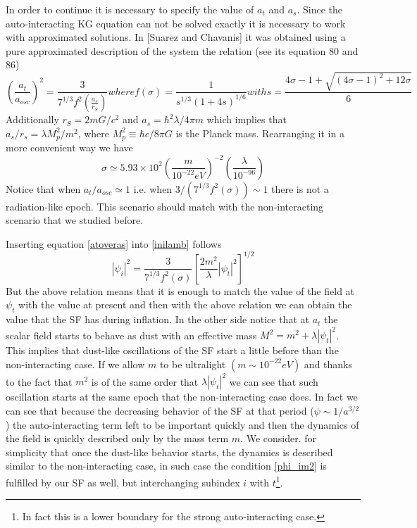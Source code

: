 \documentclass[twocolumn,           %
               showpacs,            %
               preprintnumbers,     %
               aps,                 %
               prl,          	    %
               letterpaper,             %
               superscriptaddress,      %
               nofootinbib,         %
               tightenlines,        %
               floats,floatfix      %
               ,usenatbib,
               ]{revtex4-1}
\begin{document}
In order to continue it is necessary to specify the value of $a_t$ and $a_s$. Since the auto-interacting KG equation can not be solved exactly it is necessary to work with approximated solutions. In [Suarez and Chavanis] it was obtained using a pure approximated description of the system the relation (see its equation 80 and 86)
\begin{subequations}
\begin{equation}\label{atoveras}
\left(\frac{a_t}{a_{osc}}\right)^2=\frac{3}{7^{1/3}f^2(\frac{a_s}{r_S})}
\end{equation}
where 
\begin{equation}
f(\sigma)=\frac{1}{s^{1/3}(1+4s)^{1/6}}
\end{equation}
with
\begin{equation}
s=\frac{4\sigma-1+\sqrt{(4\sigma-1)^2+12\sigma}}{6}
\end{equation}
\end{subequations}
Additionally $r_S=2mG/c^2$ and $a_s=\hbar^2\lambda/4\pi m$ which implies that $a_s/r_s=\lambda M_p^2/m^2$, where $M_p^2\equiv\hbar c/8\pi G$ is the Planck mass. Rearranging it in a more convenient way we have
\begin{equation}
\sigma \simeq 5.93\times 10^{
2}\left(\frac{m}{10^{-22}eV}\right)^{-2}\left(\frac{\lambda}{10^{-96}}\right)
\end{equation}
Notice that when $a_t/a_{osc}\simeq 1$ i.e. when $3/(7^{1/3}f^2(\sigma))\sim 1$ there is not a radiation-like epoch. This scenario should match with the non-interacting scenario that we studied before.

Inserting equation \eqref{atoveras} into \eqref{inilamb} follows
\begin{equation}\label{inilamb2}
|\psi_i|^2=\frac{3}{7^{1/3}f^2(\sigma)}\left[\frac{2m^2}{\lambda}|\psi_t|^2\right]^{1/2}
\end{equation}
But the above relation means that it is enough to match the value of the field at $\psi_t$ with the value at present and then with the above relation we can obtain the value that the SF has during inflation. In the other side notice that at $a_t$ the scalar field starts to behave as dust with an effective mass $M^2=m^2+\lambda|\psi_t|^2$. This implies that dust-like oscillations of the SF start a little before than the non-interacting case. If we allow $m$ to be ultralight $(m\sim 10^{-22}eV)$ and thanks to the fact that $m^2$ is of the same order that $\lambda|\psi_t|^2$ we can see that such oscillation starts at the same epoch that the non-interacting case does. In fact we can see that because the decreasing behavior of the SF at that period ($\psi\sim 1/a^{3/2}$) the auto-interacting term left to be important quickly and then the dynamics of the field is quickly described only by the mass term $m$. We consider. for simplicity that once the dust-like behavior starts, the dynamics is described similar to  the non-interacting case, in such case the condition \eqref{phi_im2} is fulfilled by our SF as well, but interchanging subindex $i$ with $t$\footnote{In fact this is a lower boundary for the strong auto-interacting case.}.
\end{document}
